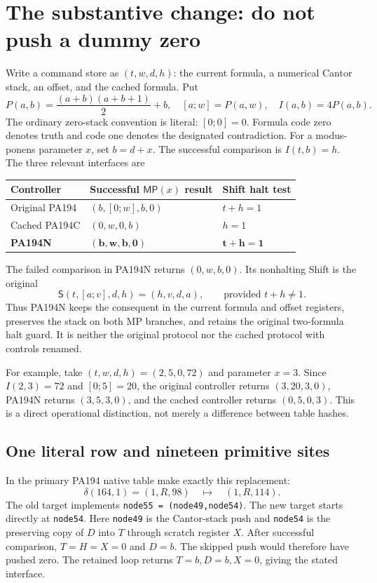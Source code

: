 \documentclass[11pt,letterpaper]{article}
\newcommand{\file}[1]{\texttt{\nolinkurl{#1}}}
\newcommand{\MP}{\mathsf{MP}}
\newcommand{\SHIFT}{\mathsf S}
\begin{document}
\section{The substantive change: do not push a dummy zero}
\label{sec:change}

Write a command store as $(t,w,d,h)$: the current formula, a numerical
Cantor stack, an offset, and the cached formula. Put
\[
 P(a,b)=\frac{(a+b)(a+b+1)}2+b,
 \quad [a;w]=P(a,w),\quad I(a,b)=4P(a,b).
\]
The ordinary zero-stack convention is literal: $[0;0]=0$. Formula code
zero denotes truth and code one denotes the designated contradiction.
For a modus-ponens parameter $x$, set $b=d+x$. The successful comparison is
$I(t,b)=h$. The three relevant interfaces are
\begin{center}
\begin{tabular}{@{}lll@{}}
\toprule
Controller & Successful $\MP(x)$ result & Shift halt test\\
\midrule
Original PA194 & $(b,[0;w],b,0)$ & $t+h=1$\\
Cached PA194C & $(0,w,0,b)$ & $h=1$\\
\textbf{PA194N} & $\boldsymbol{(b,w,b,0)}$ & $\boldsymbol{t+h=1}$\\
\bottomrule
\end{tabular}
\end{center}
The failed comparison in PA194N returns $(0,w,b,0)$. Its nonhalting Shift
is the original
\[
 \SHIFT(t,[a;v],d,h)=(h,v,d,a),
 \qquad\text{provided }t+h\ne1.
\]
Thus PA194N keeps the consequent in the current formula and offset
registers, preserves the stack on both MP branches, and retains the
original two-formula halt guard. It is neither the original protocol nor
the cached protocol with controls renamed.

For example, take $(t,w,d,h)=(2,5,0,72)$ and parameter $x=3$.
Since $I(2,3)=72$ and $[0;5]=20$, the original controller returns
$(3,20,3,0)$, PA194N returns $(3,5,3,0)$, and the cached controller
returns $(0,5,0,3)$. This is a direct operational distinction, not merely
a difference between table hashes.

\subsection{One literal row and nineteen primitive sites}

In the primary PA194 native table make exactly this replacement:
\[
 \delta(164,1)=(1,R,98)
       \quad\longmapsto\quad (1,R,114).
\]
The old target implements \file{node55 = (node49,node54)}. The new target
starts directly at \file{node54}. Here \file{node49} is the Cantor-stack
push and \file{node54} is the preserving copy of $D$ into $T$ through
scratch register $X$. After successful comparison, $T=H=X=0$ and $D=b$.
The skipped push would therefore have pushed zero. The retained loop
returns $T=b,D=b,X=0$, giving the stated interface.
\end{document}
